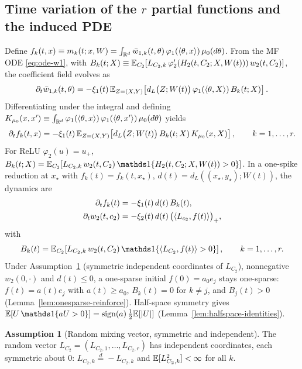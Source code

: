 \documentclass[nohyperref]{article}
\theoremstyle{plain}
\theoremstyle{definition}
\newtheorem{assumption}[theorem]{Assumption}
\theoremstyle{remark}
\begin{document}
\subsection{Time variation of the $r$ partial functions and the induced PDE}
\label{app:time-variation-pde}

Define $f_k(t,x)\equiv m_k(t;x,W)=\int_{\R^d}\bar w_{1,k}(t,\theta)\,\varphi_1(\ip{\theta}{x})\,\mu_0(d\theta)$. From the MF ODE \eqref{eq:ode-w1}, with $B_k(t;X)\equiv \mathbb{E}_{C_2}[L_{C_2,k}\,\varphi_2'(H_2(t,C_2;X,W(t)))\,w_2(t,C_2)]$, the coefficient field evolves as
\begin{equation}\label{eq:barw-evol}
\partial_t \bar w_{1,k}(t,\theta)
=-\xi_1(t)\,\mathbb{E}_{Z=(X,Y)}\!\left[d_L\big(Z;W(t)\big)\,\varphi_1(\langle \theta, X \rangle)\,B_k(t;X)\right].
\end{equation}
Differentiating under the integral and defining $K_{\mu_0}(x,x')\equiv \int_{\R^d}\varphi_1(\ip{\theta}{x})\,\varphi_1(\ip{\theta}{x'})\,\mu_0(d\theta)$ yields
\begin{equation}\label{eq:fk-kernel}
\partial_t f_k(t,x)=-\xi_1(t)\,\mathbb{E}_{Z=(X,Y)}\!\left[d_L\big(Z;W(t)\big)\,B_k(t;X)\,K_{\mu_0}(x,X)\right],\qquad k=1,\dots,r.
\end{equation}
For ReLU $\varphi_2(u)=u_+$, $B_k(t;X)=\E_{C_2}[L_{C_2,k}\,w_2(t,C_2)\,\one \{H_2(t,C_2;X,W(t))>0\}]$. In a one-spike reduction at $x_\star$ with $f_k(t)=f_k(t,x_\star)$, $d(t)=d_L((x_\star,y_\star);W(t))$, the dynamics are
\begin{align}
\partial_t f_k(t)&=-\xi_1(t)\,d(t)\,B_k(t),\label{eq:spike-f}\\
\partial_t w_2(t,c_2)&=-\xi_2(t)\,d(t)\,\big(\langle L_{c_2}, f(t) \rangle\big)_+,\label{eq:spike-w2}
\end{align}
with
\begin{equation}\label{eq:spike-B}
B_k(t)=\E_{C_2}\!\left[L_{C_2,k}\,w_2(t,C_2)\,\one \!\left\{\ip{L_{C_2}}{f(t)}>0\right\}\right],\qquad k=1,\dots,r.
\end{equation} Under Assumption~\ref{assump:L-symmetric} (symmetric independent coordinates of $L_{C_2}$), nonnegative $w_2(0,\cdot)$ and $d(t)\le 0$, a one-sparse initial $f(0)=a_0 e_j$ stays one-sparse: $f(t)=a(t)e_j$ with $a(t)\ge a_0$, $B_k(t)=0$ for $k\neq j$, and $B_j(t)>0$ (Lemma~\ref{lem:onesparse-reinforce}). Half-space symmetry gives $\E[U\,\one \{aU>0\}]=\mathrm{sign}(a)\,\frac{1}{2}\E[|U|]$ (Lemma~\ref{lem:halfspace-identities}).

\begin{assumption}[Random mixing vector, symmetric and independent]\label{assump:L-symmetric}
The random vector $L_{C_2}=(L_{C_2,1},\dots,L_{C_2,r})$ has independent coordinates, each symmetric about $0$: $L_{C_2,k}\overset{d}{=}-L_{C_2,k}$ and $\mathbb{E}[L_{C_2,k}^2]<\infty$ for all $k$.
\end{assumption}
\end{document}
